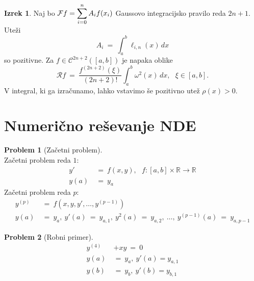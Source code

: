 \documentclass[11pt]{article}
\newcommand{\R}{\mathbb{R}}
\newcommand{\C}{\mathcal{C}}
\newcommand{\rr}{\mathcal{R}}
\newcommand{\F}{\mathcal{F}}
\theoremstyle{definition}
\theoremstyle{definition}
\newtheorem{problem}{Problem}[section]
\newtheorem{izrek}{Izrek}[section]
\begin{document}
\begin{izrek}

Naj bo $\mathlarger{\F f = \sum_{i=0}^n A_i f(x_i)}$ Gaussovo integracijsko pravilo reda $2n+1$. Uteži
$$A_i ~=~ \int_a^b \ell_{i, n}(x)\,dx$$
so pozitivne. Za $f \in \C^{2n+2}([a, b])$ je napaka oblike
$$\rr f ~=~ \frac{f^{(2n+2)}(\xi)}{(2n+2)!} \int_a^b \omega^2(x)\,dx, ~~~\xi \in [a, b].$$
V integral, ki ga izračunamo, lahko vstavimo še pozitivno utež $\rho(x) > 0$.

\end{izrek}
\vspace{0.5cm}


\pagebreak


\section{Numerično reševanje NDE}
\vspace{0.5cm}

\begin{problem}[Začetni problem]
~\\
Začetni problem reda $1$:
\begin{align*}
y' ~&=~ f(x, y), ~~~f: [a, b] \times \R \rightarrow \R \\
y(a) ~&=~ y_a
\end{align*}
Začetni problem reda $p$:
\begin{align*}
y^{(p)} ~&=~ f(x, y, y', \ldots, y^{(p-1)}) \\
y(a) ~&=~ y_a, ~y'(a) ~=~ y_{a, 1}, ~y^2(a) ~=~ y_{a, 2}, ~\ldots, ~y^{(p-1)}(a) ~=~ y_{a, p-1}
\end{align*}

\end{problem}
\vspace{0.5cm}

\begin{problem}[Robni primer]

\begin{align*}
y^{(4)} &+ xy ~=~ 0 \\
y(a) ~&=~ y_a, ~y'(a) = y_{a, 1} \\
y(b) ~&=~ y_b, ~y'(b) = y_{b, 1}
\end{align*}

\end{problem}
\vspace{0.5cm}
\end{document}
